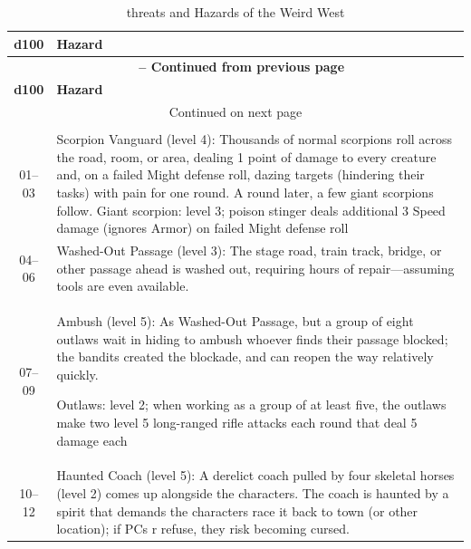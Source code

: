 \begin{longtable}{| c | p{15cm} |}
    \caption{threats and Hazards of the Weird West} \\
    \hline
    \textbf{d100} & \textbf{Hazard} \\
    \hline
    \endfirsthead

    \multicolumn{2}{c}{\textbf{\tablename\ \thetable{} -- Continued from previous page}} \\
    \hline
    \textbf{d100} & \textbf{Hazard} \\
    \hline
    \endhead

    \hline
    \multicolumn{2}{|c|}{Continued on next page} \\
    \hline
    \endfoot

    \hline
    \multicolumn{2}{|c|}{End of Table} \\
    \hline
    \endlastfoot

    
01–03 &  Scorpion Vanguard (level 4): Thousands of normal scorpions roll across the road, room, or area, dealing 1 point of damage to every creature and, on a failed Might defense roll, dazing targets (hindering their tasks) with pain for one round. A round later, a few giant scorpions follow. 
Giant scorpion: level 3; poison stinger deals additional 3 Speed damage (ignores Armor) on failed Might defense roll \\ \hline

04–06 &  Washed-Out Passage (level 3): The stage road, train track, bridge, or other passage ahead is washed out, requiring hours of repair—assuming tools are even available. \\ \hline

07–09 &  Ambush (level 5): As Washed-Out Passage, but a group of eight outlaws wait in hiding to ambush whoever finds their passage blocked; the bandits created the blockade, and can reopen the way relatively quickly. \par
Outlaws: level 2; when working as a group of at least five, the outlaws make two level 5 long-ranged rifle attacks each round that deal 5 damage each \\ \hline

10–12 &  Haunted Coach (level 5): A derelict coach pulled by four skeletal horses (level 2) comes up alongside the characters. The coach is haunted by a spirit that demands the characters race it back to town (or other location); if PCs r
refuse, they risk becoming cursed. \\ \hline


\end{longtable}
